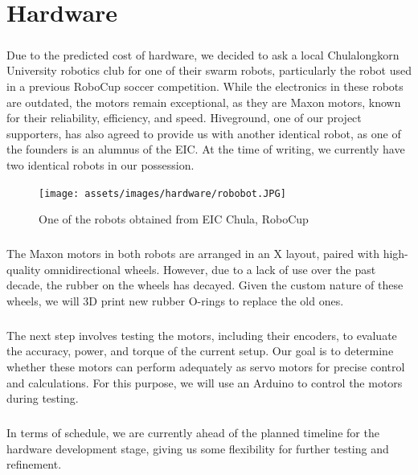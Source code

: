 \chapter{Hardware}

\paragraph*{}
Due to the predicted cost of hardware, we decided to ask a local Chulalongkorn University robotics club for one of their swarm robots, particularly the robot used in a previous RoboCup soccer competition. While the electronics in these robots are outdated, the motors remain exceptional, as they are Maxon motors, known for their reliability, efficiency, and speed. Hiveground, one of our project supporters, has also agreed to provide us with another identical robot, as one of the founders is an alumnus of the EIC. At the time of writing, we currently have two identical robots in our possession.
\begin{figure}
    \centering
    \texttt{[image: assets/images/hardware/robobot.JPG]}
    \caption{One of the robots obtained from EIC Chula, RoboCup}
    \label{fig:robobot}
\end{figure}

\paragraph*{}
The Maxon motors in both robots are arranged in an X layout, paired with high-quality omnidirectional wheels. However, due to a lack of use over the past decade, the rubber on the wheels has decayed. Given the custom nature of these wheels, we will 3D print new rubber O-rings to replace the old ones.
\paragraph*{}
The next step involves testing the motors, including their encoders, to evaluate the accuracy, power, and torque of the current setup. Our goal is to determine whether these motors can perform adequately as servo motors for precise control and calculations. For this purpose, we will use an Arduino to control the motors during testing.
\paragraph*{}
In terms of schedule, we are currently ahead of the planned timeline for the hardware development stage, giving us some flexibility for further testing and refinement.

